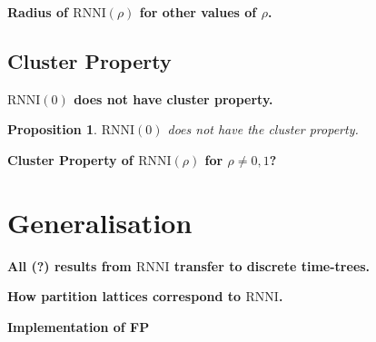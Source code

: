 \documentclass[11pt]{amsart}
\newtheorem{proposition}{Proposition}
\newcommand{\rnni}{\mathrm{RNNI}}
\newcommand{\summary}[1]{\textbf{#1}} %
\begin{document}
\summary{Radius of $\rnni(\rho)$ for other values of $\rho$.}

\subsection{Cluster Property}

\summary{$\rnni(0)$ does not have cluster property.}
\begin{proposition}
	$\rnni(0)$ does not have the cluster property.
\end{proposition}

\summary{Cluster Property of $\rnni(\rho)$ for $\rho \neq 0, 1$?}


\section{Generalisation}

\summary{All (?) results from $\rnni$ transfer to discrete time-trees.}

\summary{How partition lattices correspond to $\rnni$.}

\summary{Implementation of FP}
\end{document}
